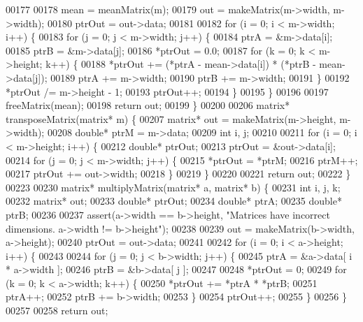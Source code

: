 \begin{DoxyCode}
{{{00177 
00178     mean = meanMatrix(m);
00179     out = makeMatrix(m->width, m->width);
00180     ptrOut = out->data;
00181 
00182     \textcolor{keywordflow}{for} (i = 0; i < m->width; i++) \{
00183         \textcolor{keywordflow}{for} (j = 0; j < m->width; j++) \{
00184              ptrA = &m->data[i];
00185              ptrB = &m->data[j];
00186              *ptrOut = 0.0;
00187              \textcolor{keywordflow}{for} (k = 0; k < m->height; k++) \{
00188                  *ptrOut += (*ptrA - mean->data[i]) * (*ptrB - mean->data[j]);
00189                  ptrA += m->width;
00190                  ptrB += m->width;
00191              \}
00192              *ptrOut /= m->height - 1;
00193              ptrOut++;
00194         \}
00195     \}
00196 
00197     freeMatrix(mean);
00198     \textcolor{keywordflow}{return} out;
00199 \}
00200 
00206 matrix* transposeMatrix(matrix* m) \{
00207     matrix* out = makeMatrix(m->height, m->width);
00208     \textcolor{keywordtype}{double}* ptrM = m->data;
00209     \textcolor{keywordtype}{int} i, j;
00210 
00211     \textcolor{keywordflow}{for} (i = 0; i < m->height; i++) \{
00212         \textcolor{keywordtype}{double}* ptrOut;
00213         ptrOut = &out->data[i];
00214         \textcolor{keywordflow}{for} (j = 0; j < m->width; j++) \{
00215             *ptrOut = *ptrM;
00216             ptrM++;
00217             ptrOut += out->width;
00218         \}
00219     \}
00220 
00221     \textcolor{keywordflow}{return} out;
00222 \}
00223 
00230 matrix* multiplyMatrix(matrix* a, matrix* b) \{
00231     \textcolor{keywordtype}{int} i, j, k;
00232     matrix* out;
00233     \textcolor{keywordtype}{double}* ptrOut;
00234     \textcolor{keywordtype}{double}* ptrA;
00235     \textcolor{keywordtype}{double}* ptrB;
00236 
00237     assert(a->width == b->height, \textcolor{stringliteral}{"Matrices have incorrect dimensions. a->width != b->height"});
00238 
00239     out = makeMatrix(b->width, a->height);
00240     ptrOut = out->data;
00241 
00242     \textcolor{keywordflow}{for} (i = 0; i < a->height; i++) \{
00243 
00244         \textcolor{keywordflow}{for} (j = 0; j < b->width; j++) \{
00245             ptrA = &a->data[ i * a->width ];
00246             ptrB = &b->data[ j ];
00247 
00248             *ptrOut = 0;
00249             \textcolor{keywordflow}{for} (k = 0; k < a->width; k++) \{
00250                 *ptrOut += *ptrA * *ptrB;
00251                 ptrA++;
00252                 ptrB += b->width;
00253             \}
00254             ptrOut++;
00255         \}
00256     \}
00257 
00258     \textcolor{keywordflow}{return} out;
}}}
\end{DoxyCode}
